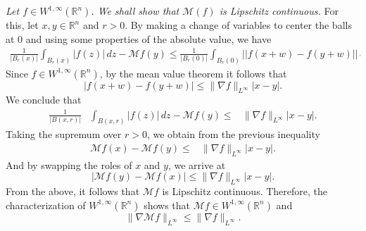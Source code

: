\documentclass[final]{beamer}
\newlength{\colwidth}
\begin{document}
\begin{frame}[t]
\begin{columns}[t]
\begin{column}{\colwidth}
\begin{alertblock}{}
    \emph{Let $f\in W^{1,\infty}(\mathbb{R}^n)$. We shall show that $\mathcal{M}(f)$ is Lipschitz continuous.}
    For this, let $x,y\in \mathbb{R}^n$ and $r>0$. By making a change of variables to center the balls at $0$ and using some properties of the absolute value, we have
    \begin{align*}
      \frac{1}{|B_{r}(x)|}\int_{B_r(x)} |f(z)|\, dz-\mathcal{M}f(y)\leq \frac{1}{|B_{r}(0)|}\int_{B_{r}(0)} \Big||f(x+w)-f(y+w)|\Big|\, dw.
    \end{align*}
    Since $f\in W^{1,\infty}(\mathbb{R}^n)$, by the mean value theorem it follows that
    \begin{equation*}
    \big|f(x+w)-f(y+w)\big|\leq \|\nabla f\|_{L^{\infty}} |x-y|.
    \end{equation*}
    We conclude that 
    \begin{equation*}
    \begin{aligned}
    \frac{1}{|B(x,r)|}&\int_{B(x,r)} |f(z)|\, dz-\mathcal{M}f(y)\leq & \|\nabla f\|_{L^{\infty}} |x-y|.
    \end{aligned}
    \end{equation*}
    Taking the supremum over $r>0$, we obtain from the previous inequality
    \begin{equation*}
    \begin{aligned}
    \mathcal{M}f(x)-\mathcal{M}f(y)\leq & \|\nabla f\|_{L^{\infty}} |x-y|.
    \end{aligned}
    \end{equation*}
    And by swapping the roles of $x$ and $y$, we arrive at
    \begin{equation*}
    \big|\mathcal{M}f(y)-\mathcal{M}f(x)\big| \leq \|\nabla f\|_{L^{\infty}} |x-y|.
    \end{equation*}
    From the above, it follows that $\mathcal{M}f$ is Lipschitz continuous. Therefore, the characterization of $W^{1,\infty}(\mathbb{R}^{n})$ shows that $\mathcal{M}f\in W^{1,\infty}(\mathbb{R}^n)$ and
    \begin{equation*}
      \|\nabla \mathcal{M}f\|_{L^{\infty}}\leq \|\nabla f\|_{L^{\infty}}.
    \end{equation*}
  \end{alertblock}


\end{column}
\end{columns}
\end{frame}
\end{document}
